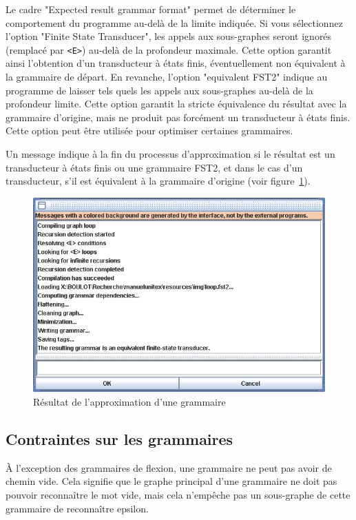 \bigskip
\noindent Le cadre "Expected result grammar format" permet de déterminer le comportement du
programme au-delà de la limite indiquée. Si vous sélectionnez l’option "Finite State Transducer",
les appels aux sous-graphes seront ignorés (remplacé par \verb+<E>+) au-delà de la profondeur
maximale. Cette option garantit ainsi l’obtention d’un transducteur à états finis, éventuellement
non équivalent à la grammaire de départ. En revanche, l’option "equivalent FST2" indique au
programme de laisser tels quels les appels aux sous-graphes au-delà de la profondeur limite.
Cette option garantit la stricte équivalence du résultat avec la grammaire d’origine, mais
ne produit pas forcément un transducteur à états finis. Cette option peut être utilisée pour
optimiser certaines grammaires.


\bigskip
\noindent Un message indique à la fin du processus d’approximation si le résultat est un transducteur
à états finis ou une grammaire FST2, et dans le cas d’un transducteur, s’il est équivalent
à la grammaire d’origine (voir figure~\ref{fig-flatten-result}).


\bigskip
\begin{figure}[!h]
\begin{center}
\includegraphics[width=14.7cm]{resources/img/fig6-6.png}
\caption{Résultat de l’approximation d’une grammaire\label{fig-flatten-result}}
\end{center}
\end{figure}


\subsection{Contraintes sur les grammaires}
À l’exception des grammaires de flexion, une grammaire ne peut pas avoir de chemin
vide. Cela signifie que le graphe principal d’une grammaire ne doit pas pouvoir reconnaître
le mot vide, mais cela n’empêche pas un sous-graphe de cette grammaire de reconnaître
epsilon.



